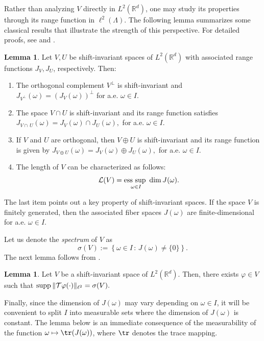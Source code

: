 \documentclass[a4paper,11pt]{amsart}
\theoremstyle{definition}
\newtheorem{lem}[fed]{Lemma}
\theoremstyle{definition}
\def\La{\Lambda}
\def\w{\omega}
\def\R{\mathbb{R}}
\newcommand{\supp}{{\rm supp\,}}
\begin{document}
	Rather than analyzing $V$ directly in  $L^2(\R^d)$, one may study its properties through its range function in $\ell^2(\La)$. The following lemma summarizes some classical results that illustrate the strength of this perspective. For detailed proofs, see  \cite{BDR2} and \cite{AC}.  
	
	\begin{lem}\label{range-properties}
		Let $V, U$ be shift-invariant spaces of $L^2(\R^d)$ with associated range functions $J_V, J_U$, respectively. Then:
		\begin{enumerate}
			\item[i)]\label{item 1 range-properties} The orthogonal complement  $V^{\perp}$ is shift-invariant and $J_{V^{\perp}}(\w)=\left(J_V(\w)\right)^{\perp}$ for a.e. $\w\in I $.
			\item[ii)]\label{item 2 range-properties} The space  $V\cap U$ is  shift-invariant and its range function satisfies $J_{V\cap\, U}(\omega) = J_V(\omega) \cap J_U(\omega),$
			for a.e. $\omega\in I$.
			\item[iii)]\label{item 3 range-properties} If $V$ and $U$ are orthogonal, then $V\oplus U$ is shift-invariant and its range function is given by $J_{V\oplus U}(\omega) = J_V(\omega) \oplus J_U(\omega),$ for a.e. $\omega\in I$.
			\item[iv)] The length of $V$ can be characterized as follows:
			$$\mathcal{L}(V) = \underset{\omega\in I}{\text{\rm ess sup }}  \dim J(\omega).$$
		\end{enumerate}
	\end{lem}
	
	The last item points out a key property of shift-invariant spaces. If the space $V$ is finitely generated, then the associated fiber spaces $J(\w)$ are finite-dimensional for a.e. $\w\in I$. 
	
	Let us denote the {\it spectrum} of $V$ as $$ \sigma(V) := \left\{\omega \in I\,:\,  J(\omega) \neq\{0\} \right\}.$$
	The next  lemma follows from \cite[Proposition 2.9 and Lemma 3.6]{BDR2}.  
	
	\begin{lem}\label{spec principal}
		Let $V$ be a shift-invariant space of $L^2(\R^d)$. Then, there exists $\varphi\in V$ such that $\supp \|\mathcal T \varphi(\cdot)\|_{\ell^2}=\sigma(V).$
	\end{lem}
	
	Finally, since the dimension of $J(\w)$ may vary depending on $\w\in I$, it will be  convenient to split $I$ into measurable sets where the dimension of $J(\w)$ is constant. The lemma below is an immediate consequence of the measurability of the function $\w\mapsto\tr(J(\w))$, where $\tr$ denotes the trace mapping.
	
\end{document}

